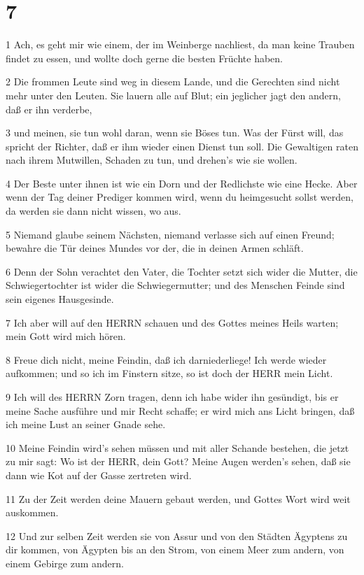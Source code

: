\chapter{7}

\par 1 Ach, es geht mir wie einem, der im Weinberge nachliest, da man keine Trauben findet zu essen, und wollte doch gerne die besten Früchte haben.
\par 2 Die frommen Leute sind weg in diesem Lande, und die Gerechten sind nicht mehr unter den Leuten. Sie lauern alle auf Blut; ein jeglicher jagt den andern, daß er ihn verderbe,
\par 3 und meinen, sie tun wohl daran, wenn sie Böses tun. Was der Fürst will, das spricht der Richter, daß er ihm wieder einen Dienst tun soll. Die Gewaltigen raten nach ihrem Mutwillen, Schaden zu tun, und drehen's wie sie wollen.
\par 4 Der Beste unter ihnen ist wie ein Dorn und der Redlichste wie eine Hecke. Aber wenn der Tag deiner Prediger kommen wird, wenn du heimgesucht sollst werden, da werden sie dann nicht wissen, wo aus.
\par 5 Niemand glaube seinem Nächsten, niemand verlasse sich auf einen Freund; bewahre die Tür deines Mundes vor der, die in deinen Armen schläft.
\par 6 Denn der Sohn verachtet den Vater, die Tochter setzt sich wider die Mutter, die Schwiegertochter ist wider die Schwiegermutter; und des Menschen Feinde sind sein eigenes Hausgesinde.
\par 7 Ich aber will auf den HERRN schauen und des Gottes meines Heils warten; mein Gott wird mich hören.
\par 8 Freue dich nicht, meine Feindin, daß ich darniederliege! Ich werde wieder aufkommen; und so ich im Finstern sitze, so ist doch der HERR mein Licht.
\par 9 Ich will des HERRN Zorn tragen, denn ich habe wider ihn gesündigt, bis er meine Sache ausführe und mir Recht schaffe; er wird mich ans Licht bringen, daß ich meine Lust an seiner Gnade sehe.
\par 10 Meine Feindin wird's sehen müssen und mit aller Schande bestehen, die jetzt zu mir sagt: Wo ist der HERR, dein Gott? Meine Augen werden's sehen, daß sie dann wie Kot auf der Gasse zertreten wird.
\par 11 Zu der Zeit werden deine Mauern gebaut werden, und Gottes Wort wird weit auskommen.
\par 12 Und zur selben Zeit werden sie von Assur und von den Städten Ägyptens zu dir kommen, von Ägypten bis an den Strom, von einem Meer zum andern, von einem Gebirge zum andern.
